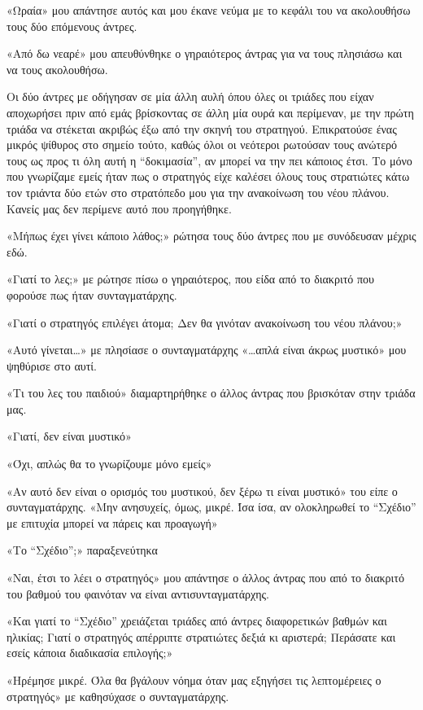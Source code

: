 \documentclass[12pt,twoside, openany]{book}
\begin{document}
«Ωραία» μου απάντησε αυτός και μου έκανε νεύμα με το κεφάλι του να ακολουθήσω τους δύο επόμενους άντρες.

«Από δω νεαρέ» μου απευθύνθηκε ο γηραιότερος άντρας για να τους πλησιάσω και να τους ακολουθήσω.

Οι δύο άντρες με οδήγησαν σε μία άλλη αυλή όπου όλες οι τριάδες που είχαν αποχωρήσει πριν από εμάς βρίσκοντας σε άλλη μία ουρά και περίμεναν, με την πρώτη τριάδα να στέκεται ακριβώς έξω από την σκηνή του στρατηγού. Επικρατούσε ένας μικρός ψίθυρος στο σημείο τούτο, καθώς όλοι οι νεότεροι ρωτούσαν τους ανώτερό τους ως προς τι όλη αυτή η “δοκιμασία”, αν μπορεί να την πει κάποιος έτσι. Το μόνο που γνωρίζαμε εμείς ήταν πως ο στρατηγός είχε καλέσει όλους τους στρατιώτες κάτω τον τριάντα δύο ετών στο στρατόπεδο μου για την ανακοίνωση του νέου πλάνου. Κανείς μας δεν περίμενε αυτό που προηγήθηκε.

«Μήπως έχει γίνει κάποιο λάθος;» ρώτησα τους δύο άντρες που με συνόδευσαν μέχρις εδώ.

«Γιατί το λες;» με ρώτησε πίσω ο γηραιότερος, που είδα από το διακριτό που φορούσε πως ήταν συνταγματάρχης.

«Γιατί ο στρατηγός επιλέγει άτομα; Δεν θα γινόταν ανακοίνωση του νέου πλάνου;»

«Αυτό γίνεται…» με πλησίασε ο συνταγματάρχης «…απλά είναι άκρως μυστικό» μου ψηθύρισε στο αυτί.

«Τι του λες του παιδιού» διαμαρτηρήθηκε ο άλλος άντρας που βρισκόταν στην τριάδα μας.

«Γιατί, δεν είναι μυστικό»

«Όχι, απλώς θα το γνωρίζουμε μόνο εμείς»

«Αν αυτό δεν είναι ο ορισμός του μυστικού, δεν ξέρω τι είναι μυστικό» του είπε ο συνταγματάρχης. «Μην ανησυχείς, όμως, μικρέ. Ίσα ίσα, αν ολοκληρωθεί το “Σχέδιο” με επιτυχία μπορεί να πάρεις και προαγωγή»

«Το “Σχέδιο”;» παραξενεύτηκα

«Ναι, έτσι το λέει ο στρατηγός» μου απάντησε ο άλλος άντρας που από το διακριτό του βαθμού του φαινόταν να είναι αντισυνταγματάρχης. 

«Και γιατί το “Σχέδιο” χρειάζεται τριάδες από άντρες διαφορετικών βαθμών και ηλικίας; Γιατί ο στρατηγός απέρριπτε στρατιώτες δεξιά κι αριστερά; Περάσατε και εσείς κάποια διαδικασία επιλογής;»

«Ηρέμησε μικρέ. Όλα θα βγάλουν νόημα όταν μας εξηγήσει τις λεπτομέρειες ο στρατηγός» με καθησύχασε ο συνταγματάρχης.
\end{document}
